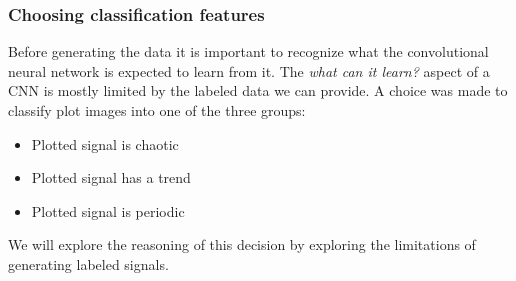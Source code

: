 \documentclass[a4paper,12pt,fleqn]{article}
\begin{document}
\subsubsection{Choosing classification features}
Before generating the data it is important to recognize what the convolutional neural network is expected to learn from it.
The \emph{what can it learn?} aspect of a CNN is mostly limited by the labeled data we can provide.
A choice was made to classify plot images into one of the three groups:
\begin{itemize}
  \item Plotted signal is chaotic
  \item Plotted signal has a trend
  \item Plotted signal is periodic
\end{itemize}
We will explore the reasoning of this decision by exploring the limitations of generating labeled signals.


\end{document}
